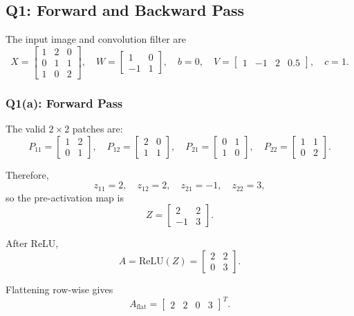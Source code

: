 \documentclass[11pt]{article}
\begin{document}
\subsection{Q1: Forward and Backward Pass}

The input image and convolution filter are
\[
X=
\begin{bmatrix}
1 & 2 & 0\\
0 & 1 & 1\\
1 & 0 & 2
\end{bmatrix},
\quad
W=
\begin{bmatrix}
1 & 0\\
-1 & 1
\end{bmatrix},
\quad
b=0,
\quad
V=
\begin{bmatrix}
1 & -1 & 2 & 0.5
\end{bmatrix},
\quad
c=1.
\]

\subsubsection*{Q1(a): Forward Pass}

The valid \(2\times2\) patches are:
\[
P_{11}=
\begin{bmatrix}
1 & 2\\
0 & 1
\end{bmatrix},
\quad
P_{12}=
\begin{bmatrix}
2 & 0\\
1 & 1
\end{bmatrix},
\quad
P_{21}=
\begin{bmatrix}
0 & 1\\
1 & 0
\end{bmatrix},
\quad
P_{22}=
\begin{bmatrix}
1 & 1\\
0 & 2
\end{bmatrix}.
\]

Therefore,
\[
z_{11}=2,\quad
z_{12}=2,\quad
z_{21}=-1,\quad
z_{22}=3,
\]
so the pre-activation map is
\[
Z=
\begin{bmatrix}
2 & 2\\
-1 & 3
\end{bmatrix}.
\]

After ReLU,
\[
A=\text{ReLU}(Z)=
\begin{bmatrix}
2 & 2\\
0 & 3
\end{bmatrix}.
\]

Flattening row-wise gives
\[
A_{\text{flat}}=
\begin{bmatrix}
2 & 2 & 0 & 3
\end{bmatrix}^{T}.
\]
\end{document}
